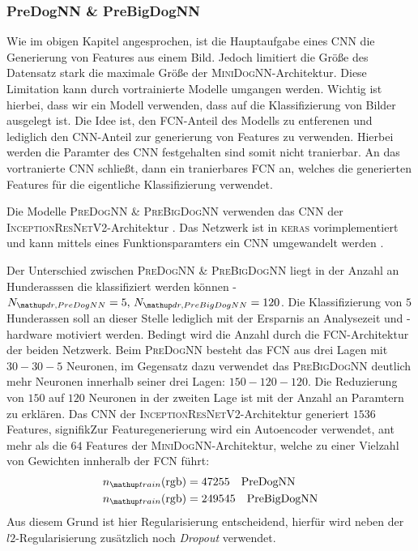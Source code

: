 \subsubsection{PreDogNN \& PreBigDogNN}
Wie im obigen Kapitel angesprochen, ist die Hauptaufgabe eines CNN die Generierung
von Features aus einem Bild. Jedoch limitiert die Größe des Datensatz stark
die maximale Größe der \textsc{MiniDogNN}-Architektur. Diese Limitation
kann durch vortrainierte Modelle umgangen werden. Wichtig ist hierbei, dass wir
ein Modell verwenden, dass auf die Klassifizierung von Bilder ausgelegt ist.
Die Idee ist, den FCN-Anteil des Modells zu entferenen und lediglich den CNN-Anteil
zur generierung von Features zu verwenden. Hierbei werden die Paramter des CNN
festgehalten sind somit nicht tranierbar. An das vortranierte CNN schließt, dann
ein tranierbares FCN an, welches die generierten Features für die eigentliche
Klassifizierung verwendet.

Die Modelle \textsc{PreDogNN \& PreBigDogNN} verwenden das CNN der
\textsc{InceptionResNetV2}-Architektur \cite{InceptionResNetV2}. Das Netzwerk
ist in \textsc{keras} vorimplementiert und kann mittels eines Funktionsparamters
ein CNN umgewandelt werden \cite{keras_InceptionResNetV2}.

Der Unterschied zwischen \textsc{PreDogNN \& PreBigDogNN} liegt in der Anzahl
an Hunderasssen die klassifiziert werden können -
$N\ua{dr, PreDogNN}=5,\, N\ua{dr, PreBigDogNN}=120$. Die Klassifizierung von $5$ Hunderassen
soll an dieser Stelle lediglich mit der Ersparnis an Analysezeit und -hardware
motiviert werden. Bedingt wird die Anzahl durch die FCN-Architektur der beiden
Netzwerk. Beim \textsc{PreDogNN} besteht das FCN aus drei Lagen mit $30-30-5$
Neuronen, im Gegensatz dazu verwendet das \textsc{PreBigDogNN} deutlich
mehr Neuronen innerhalb seiner drei Lagen: $150-120-120$. Die Reduzierung von
$150$ auf $120$ Neuronen in der zweiten Lage ist mit der Anzahl an Paramtern
zu erklären. Das CNN der \textsc{InceptionResNetV2}-Architektur generiert
$1536$ Features, signifikZur Featuregenerierung wird ein Autoencoder verwendet, ant mehr als die $64$ Features der \textsc{MiniDogNN}-Architektur, welche zu einer Vielzahl von Gewichten innheralb der FCN führt:
\begin{align}
  \begin{aligned}
  \label{eq:ntrain_PreDogNN_PreBigDogNN}
  n\ua{train}(\mathrm{rgb}) &= 47255 \quad \mathrm{PreDogNN} \\
  n\ua{train}(\mathrm{rgb}) &= 249545 \quad \mathrm{PreBigDogNN}
\end{aligned}
\end{align}
Aus diesem Grund ist hier Regularisierung entscheidend, hierfür wird neben der
$l2$-Regularisierung zusätzlich noch \emph{Dropout} verwendet.

